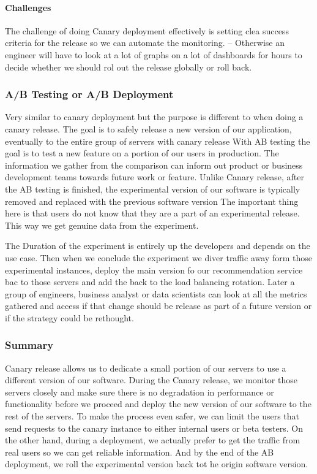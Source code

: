 \paragraph{Challenges}
The challenge of doing Canary deployment effectively is setting clea success criteria for the release so we can automate the monitoring.
-- Otherwise an engineer will have to look at a lot of graphs on a lot of dashboards for hours to decide whether we should rol out the release globally or roll back.

\subsubsection{A/B Testing or A/B Deployment}
Very similar to canary deployment but the purpose is different to when doing a canary release.
The goal is to safely release a new version of our application, eventually to the entire group of servers with canary release
With AB testing the goal is to test a new feature on a portion of our users in production.
The information we gather from the comparison can inform out product or business development teams towards future work or feature.
Unlike Canary release, after the AB testing is finished, the experimental version of our software is typically removed and replaced with the previous software version
The important thing here is that users do not know that they are a part of an experimental release.
This way we get genuine data from the experiment.

The Duration of the experiment is entirely up the developers and depends on the use case.
Then when we conclude the experiment we diver traffic away form those experimental instances, deploy the main version fo our recommendation service bac to those servers and add the back to the load balancing rotation.
Later a group of engineers, business analyst or data scientists can look at all the metrics gathered and access if that change should be release as part of a future version or if the strategy could be rethought.

\subsubsection{Summary}
Canary release allows us to dedicate a small portion of our servers to use a different version of our software.
During the Canary release, we monitor those servers closely and make sure there is no degradation in performance or functionality before we proceed and deploy the new version of our software to the rest of the servers.
To make the process even safer, we can limit the users that send requests to the canary instance to either internal users or beta testers.
On the other hand, during a  deployment, we actually prefer to get the traffic from real users so we can get reliable information.
And by the end of the AB deployment, we roll the experimental version back tot he origin software version.

